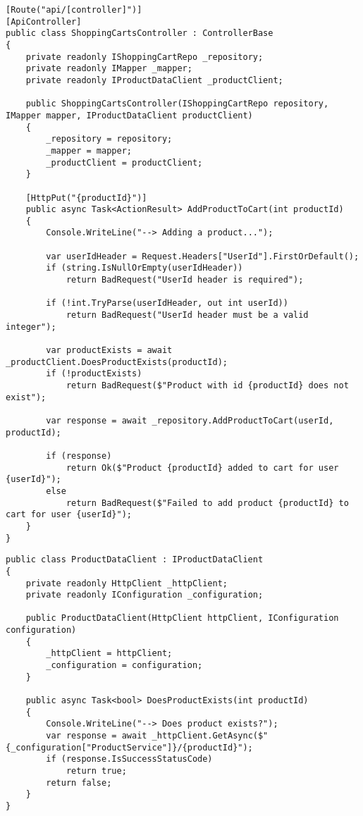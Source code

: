 \begin{lstlisting}[style=mystyleA, caption=ShoppingCartsController.cs (fragment)(Microservice), label=lst:MicroSCCPUT]
[Route("api/[controller]")]
[ApiController]
public class ShoppingCartsController : ControllerBase
{
	private readonly IShoppingCartRepo _repository;
	private readonly IMapper _mapper;
	private readonly IProductDataClient _productClient;
	
	public ShoppingCartsController(IShoppingCartRepo repository, IMapper mapper, IProductDataClient productClient)
	{
		_repository = repository;
		_mapper = mapper;
		_productClient = productClient;
	}
	
	[HttpPut("{productId}")]
	public async Task<ActionResult> AddProductToCart(int productId)
	{
		Console.WriteLine("--> Adding a product...");
		
		var userIdHeader = Request.Headers["UserId"].FirstOrDefault();
		if (string.IsNullOrEmpty(userIdHeader))
			return BadRequest("UserId header is required");
		
		if (!int.TryParse(userIdHeader, out int userId))
			return BadRequest("UserId header must be a valid integer");
		
		var productExists = await _productClient.DoesProductExists(productId);
		if (!productExists)
			return BadRequest($"Product with id {productId} does not exist");
		
		var response = await _repository.AddProductToCart(userId, productId);
		
		if (response)
			return Ok($"Product {productId} added to cart for user {userId}");
		else
			return BadRequest($"Failed to add product {productId} to cart for user {userId}");
	}
}
\end{lstlisting}

\begin{lstlisting}[style=mystyleA, caption=ProductDataClient.cs (fragment)(Microservice), label=lst:MicroProductDataCl]
public class ProductDataClient : IProductDataClient
{
	private readonly HttpClient _httpClient;
	private readonly IConfiguration _configuration;
	
	public ProductDataClient(HttpClient httpClient, IConfiguration configuration)
	{
		_httpClient = httpClient;
		_configuration = configuration;
	}
	
	public async Task<bool> DoesProductExists(int productId)
	{
		Console.WriteLine("--> Does product exists?");
		var response = await _httpClient.GetAsync($"{_configuration["ProductService"]}/{productId}");
		if (response.IsSuccessStatusCode)
			return true;
		return false;
	}
}
\end{lstlisting}

